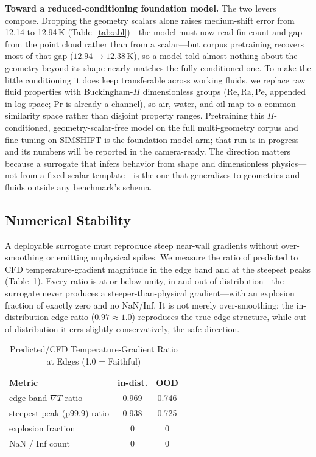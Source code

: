 \documentclass[conference]{IEEEtran}
\begin{document}
\textbf{Toward a reduced-conditioning foundation model.} The two levers compose. Dropping the geometry
scalars alone raises medium-shift error from 12.14 to 12.94\,K (Table~\ref{tab:abl})---the model must now
read fin count and gap from the point cloud rather than from a scalar---but corpus pretraining recovers most
of that gap ($12.94\!\to\!12.38$\,K), so a model told almost nothing about the geometry beyond its shape
nearly matches the fully conditioned one. To make the little conditioning it does keep transferable across
working fluids, we replace raw fluid properties with Buckingham-$\Pi$ dimensionless groups
($\mathrm{Re},\mathrm{Ra},\mathrm{Pe}$, appended in log-space; $\mathrm{Pr}$ is already a channel), so air,
water, and oil map to a common similarity space rather than disjoint property ranges. Pretraining this
$\Pi$-conditioned, geometry-scalar-free model on the full multi-geometry corpus and fine-tuning on SIMSHIFT
is the foundation-model arm; that run is in progress and its numbers will be reported in the camera-ready.
The direction matters because a surrogate that infers behavior from shape and dimensionless physics---not
from a fixed scalar template---is the one that generalizes to geometries and fluids outside any benchmark's
schema.

\subsection{Numerical Stability}\label{sec:stab}
A deployable surrogate must reproduce steep near-wall gradients without over-smoothing or emitting
unphysical spikes. We measure the ratio of predicted to CFD temperature-gradient magnitude in the edge
band and at the steepest peaks (Table~\ref{tab:stab}). Every ratio is at or below unity, in and out of
distribution---the surrogate never produces a steeper-than-physical gradient---with an explosion
fraction of exactly zero and no NaN/Inf. It is not merely over-smoothing: the in-distribution edge
ratio ($0.97\approx1.0$) reproduces the true edge structure, while out of distribution it errs
slightly conservatively, the safe direction.

\begin{table}[t]\renewcommand{\arraystretch}{1.2}
\caption{Predicted/CFD Temperature-Gradient Ratio at Edges (1.0 = Faithful)}
\label{tab:stab}\centering
\begin{tabular}{@{}lcc@{}}\toprule
Metric & in-dist. & OOD \\ \midrule
edge-band $\nabla T$ ratio & 0.969 & 0.746 \\
steepest-peak (p99.9) ratio & 0.938 & 0.725 \\
explosion fraction & 0 & 0 \\
NaN / Inf count & 0 & 0 \\ \bottomrule
\end{tabular}
\end{table}
\end{document}
